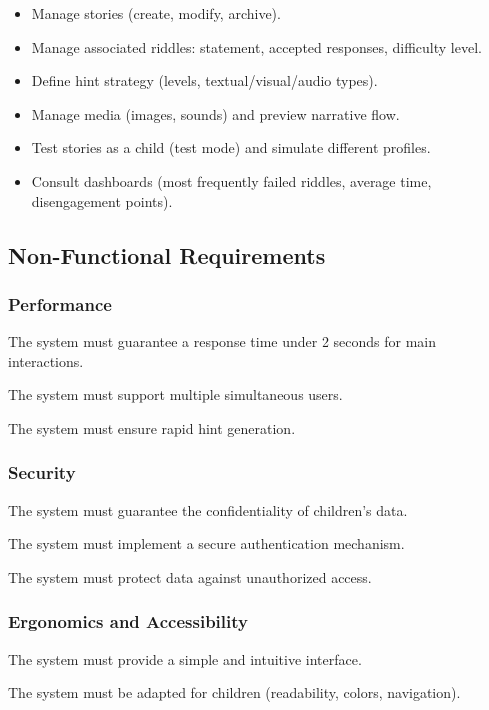 \documentclass[12pt,a4paper]{article}
\begin{document}
\begin{itemize}
    \item Manage stories (create, modify, archive).
    \item Manage associated riddles: statement, accepted responses, difficulty level.
    \item Define hint strategy (levels, textual/visual/audio types).
    \item Manage media (images, sounds) and preview narrative flow.
    \item Test stories as a child (test mode) and simulate different profiles.
    \item Consult dashboards (most frequently failed riddles, average time, disengagement points).
\end{itemize}

\subsection{Non-Functional Requirements}

\subsubsection{Performance}

The system must guarantee a response time under 2 seconds for main interactions.

The system must support multiple simultaneous users.

The system must ensure rapid hint generation.

\subsubsection{Security}

The system must guarantee the confidentiality of children's data.

The system must implement a secure authentication mechanism.

The system must protect data against unauthorized access.

\subsubsection{Ergonomics and Accessibility}

The system must provide a simple and intuitive interface.

The system must be adapted for children (readability, colors, navigation).
\end{document}
